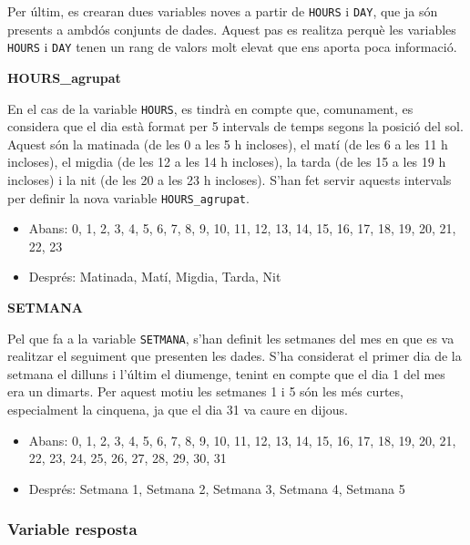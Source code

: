\documentclass[11pt,longbibliography]{article}
\theoremstyle{definition}
\theoremstyle{remark}
\begin{document}
Per últim, es crearan dues variables noves a partir de \texttt{HOURS} i \texttt{DAY}, que ja són presents a ambdós conjunts de dades. Aquest pas es realitza perquè les variables \texttt{HOURS} i \texttt{DAY} tenen un rang de valors molt elevat que ens aporta poca informació. 

\textbf{HOURS\_agrupat}

En el cas de la variable \texttt{HOURS}, es tindrà en compte que, comunament, es considera que el dia està format per 5 intervals de temps segons la posició del sol. Aquest són la matinada (de les 0 a les 5 h incloses), el matí (de les 6 a les 11 h incloses), el migdia (de les 12 a les 14 h incloses), la tarda (de les 15 a les 19 h incloses) i la nit (de les 20 a les 23 h incloses). S'han fet servir aquests intervals per definir la nova variable \texttt{HOURS\_agrupat}.

\begin{itemize}

\item Abans: 0, 1, 2, 3, 4, 5, 6, 7, 8, 9, 10, 11, 12, 13, 14, 15, 16, 17, 18, 19, 20, 21, 22, 23

\item Després: Matinada, Matí, Migdia, Tarda, Nit

\end{itemize}


\textbf{SETMANA}


Pel que fa a la variable \texttt{SETMANA}, s'han definit les setmanes del mes en que es va realitzar el seguiment que presenten les dades. S'ha considerat el primer dia de la setmana el dilluns i l'últim el diumenge, tenint en compte que el dia 1 del mes era un dimarts. Per aquest motiu les setmanes 1 i 5 són les més curtes, especialment la cinquena, ja que el dia 31 va caure en dijous.


\begin{itemize}

\item Abans: 0, 1, 2, 3, 4, 5, 6, 7, 8, 9, 10, 11, 12, 13, 14, 15, 16, 17, 18, 19, 20, 21, 22, 23, 24, 25, 26, 27, 28, 29, 30, 31

\item Després: Setmana 1, Setmana 2, Setmana 3, Setmana 4, Setmana 5

\end{itemize}


\subsubsection{Variable resposta}
\end{document}
